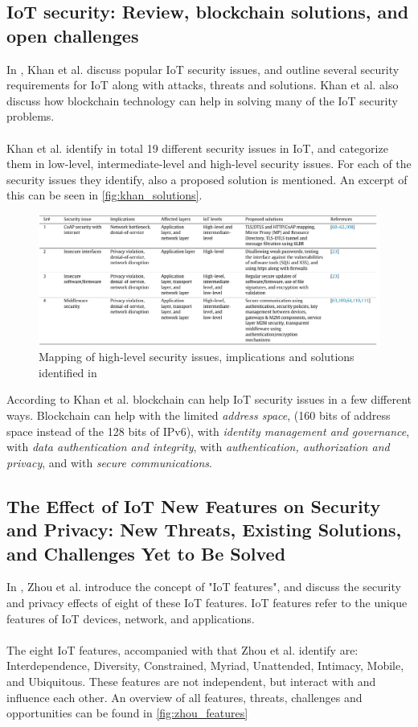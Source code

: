 \documentclass[a4paper,10pt]{article}
\begin{document}
\subsection{IoT security: Review, blockchain solutions, and open challenges} \label{sec:literature_review:khan2018}
In \cite{Khan2018}, Khan et al. discuss popular IoT security issues, and outline several security requirements for IoT along
with attacks, threats and solutions. Khan et al. also discuss how blockchain technology can help in solving many of the 
IoT security problems. 
\\\\
Khan et al. identify in total 19 different security issues in IoT, and categorize them in low-level, intermediate-level and 
high-level security issues. For each of the security issues they identify, also a proposed solution is mentioned. An excerpt
of this can be seen in \autoref{fig:khan_solutions}.

\begin{figure}[hbtp]
 \centering
 \includegraphics[width=\linewidth]{khan.png}
 \caption{Mapping of high-level security issues, implications and solutions identified in \cite{Khan2018}}
 \label{fig:khan_solutions}
\end{figure}

According to Khan et al. blockchain can help IoT security issues in a few different ways. Blockchain can help with the 
limited \textit{address space}, (160 bits of address space instead of the 128 bits of IPv6), with \textit{ identity management 
and governance}, with \textit{data authentication and integrity}, with \textit{authentication, authorization and privacy}, 
and with \textit{secure communications}.

\subsection{The Effect of IoT New Features on Security and Privacy: New Threats, Existing Solutions, and Challenges Yet to Be Solved} \label{sec:literature_review:zhou2019}
In \cite{Zhou2019}, Zhou et al. introduce the concept of "IoT features", and discuss the security and privacy effects of 
eight of these IoT features. IoT features refer to the unique features of IoT devices, network, and applications.
\\\\
The eight IoT features, accompanied with  that Zhou et al. identify are: Interdependence, Diversity, Constrained, Myriad, 
Unattended, Intimacy, Mobile, and Ubiquitous. These features are not independent, but interact with and influence each
other. An overview of all features, threats, challenges and opportunities can be found in \autoref{fig:zhou_features}
\end{document}
